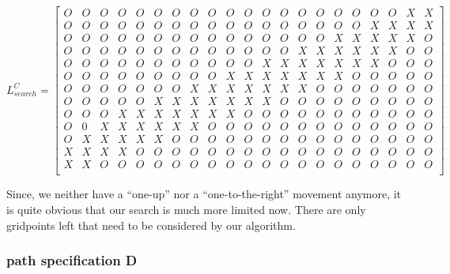 \[ L_{search}^C = 
\left[
\begin{array}{cccccccccccccccccccccc}
 O & O & O & O & O & O & O & O & O & O & O & O & O & O & O & O & O & O & O & X & X \\ 
 O & O & O & O & O & O & O & O & O & O & O & O & O & O & O & O & O & X & X & X & X \\ 
 O & O & O & O & O & O & O & O & O & O & O & O & O & O & O & X & X & X & X & X & O \\ 
 O & O & O & O & O & O & O & O & O & O & O & O & O & X & X & X & X & X & X & O & O \\ 
 O & O & O & O & O & O & O & O & O & O & O & X & X & X & X & X & X & X & O & O & O \\ 
 O & O & O & O & O & O & O & O & O & X & X & X & X & X & X & X & O & O & O & O & O \\ 
 O & O & O & O & O & O & O & X & X & X & X & X & X & X & O & O & O & O & O & O & O \\ 
 O & O & O & O & O & X & X & X & X & X & X & X & O & O & O & O & O & O & O & O & O \\ 
 O & O & O & X & X & X & X & X & X & X & O & O & O & O & O & O & O & O & O & O & O \\ 
 O & 0 & X & X & X & X & X & X & O & O & O & O & O & O & O & O & O & O & O & O & O \\ 
 O & X & X & X & X & X & O & O & O & O & O & O & O & O & O & O & O & O & O & O & O \\ 
 X & X & X & X & O & O & O & O & O & O & O & O & O & O & O & O & O & O & O & O & O \\ 
 X & X & O & O & O & O & O & O & O & O & O & O & O & O & O & O & O & O & O & O & O \\ 
\end{array}
\right]
\]

Since, we neither have a ``one-up'' nor a ``one-to-the-right'' movement anymore, it is 
quite obvious that our search is much more limited now. There are only  gridpoints 
left that need to be considered by our algorithm.


\subsubsection*{path specification D} %
\label{ssub:path_specification_d}

